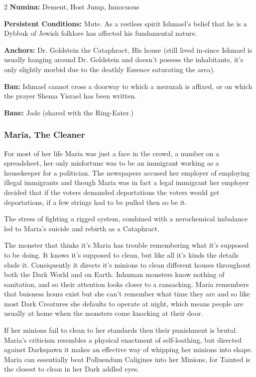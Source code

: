 \begin{multicols}{2}
\noindent \textbf{Numina:} Dement, Host Jump, Innocuous

\noindent \textbf{Persistent Conditions:} Mute. As a restless spirit Ishmael's belief that he is a Dybbuk of Jewish folklore has affected his fundamental nature. 

\noindent \textbf{Anchors:} Dr. Goldstein the Cataphract, His house (still lived in-since Ishmael is usually hanging around Dr. Goldstein and doesn't possess the inhabitants, it's only slightly morbid due to the deathly Essence saturating the area).

\noindent \textbf{Ban:} Ishmael cannot cross a doorway to which a mezuzah is affixed, or on which the prayer Shema Yisrael has been written.

\noindent \textbf{Bane:} Jade (shared with the Ring-Eater.)

\subsubsection*{Maria, The Cleaner}

For most of her life Maria was just a face in the crowd, a number on a spreadsheet, her only misfortune was to be an immigrant working as a housekeeper for a politician. The newspapers accused her employer of employing illegal immigrants and though Maria was in fact a legal immigrant her employer decided that if the voters demanded deportations the voters would get deportations, if a few strings had to be pulled then so be it. 

The stress of fighting a rigged system, combined with a nerochemical imbalance led to Maria's suicide and rebirth as a Cataphract. 

The monster that thinks it's Maria has trouble remembering what it's supposed to be doing. It knows it's supposed to clean, but like all it's kinds the details elude it. Consiquently it directs it's minions to clean different houses throughout both the Dark World and on Earth. Inhuman monsters know nothing of sanitation, and so their attention looks closer to a ransacking. Maria remembers that buisness hours exist but she can't remember what time they are and so like most Dark Creatures she defaults to operate at night, which means people are usually at home when the monsters come knocking at their door.

If her minions fail to clean to her standards then their punishment is brutal. Maria's criticism resembles a physical enactment of self-loathing, but directed against Darkspawn it makes an effective way of whipping her minions into shape. Maria can essentially beat Polluendum Caligines into her Minions, for Tainted is the closest to clean in her Dark addled eyes. 


\end{multicols}
